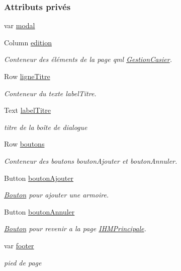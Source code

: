 \subsubsection*{Attributs privés}
\begin{DoxyCompactItemize}
\item 
var \hyperlink{class_gestion_casier_a69282746b4d8ccc4b8cc3eb48daa221f}{modal}
\item 
Column \hyperlink{class_gestion_casier_ae3b56541d15085b982f69e69729b0104}{edition}
\begin{DoxyCompactList}\small\item\em Conteneur des éléments de la page qml \hyperlink{class_gestion_casier}{Gestion\+Casier}. \end{DoxyCompactList}\item 
Row \hyperlink{class_gestion_casier_a2dd3bf1dfa3fc26940ad5ee3d8946fb1}{ligne\+Titre}
\begin{DoxyCompactList}\small\item\em Conteneur du texte label\+Titre. \end{DoxyCompactList}\item 
Text \hyperlink{class_gestion_casier_aedb927d945ca217f1c77b323c687a600}{label\+Titre}
\begin{DoxyCompactList}\small\item\em titre de la boîte de dialogue \end{DoxyCompactList}\item 
Row \hyperlink{class_gestion_casier_afffd9ec2abc546a609f1f52e9b53fe74}{boutons}
\begin{DoxyCompactList}\small\item\em Conteneur des boutons bouton\+Ajouter et bouton\+Annuler. \end{DoxyCompactList}\item 
Button \hyperlink{class_gestion_casier_a420e49d3b8c2f6de01c4d8144100a55f}{bouton\+Ajouter}
\begin{DoxyCompactList}\small\item\em \hyperlink{class_bouton}{Bouton} pour ajouter une armoire. \end{DoxyCompactList}\item 
Button \hyperlink{class_gestion_casier_aab10c4819521f4fd1a399c69a14c8a64}{bouton\+Annuler}
\begin{DoxyCompactList}\small\item\em \hyperlink{class_bouton}{Bouton} pour revenir a la page \hyperlink{class_i_h_m_principale}{I\+H\+M\+Principale}. \end{DoxyCompactList}\item 
var \hyperlink{class_gestion_casier_a2b31e765450dcc69d77e1130dec26f4e}{footer}
\begin{DoxyCompactList}\small\item\em pied de page \end{DoxyCompactList}\end{DoxyCompactItemize}


